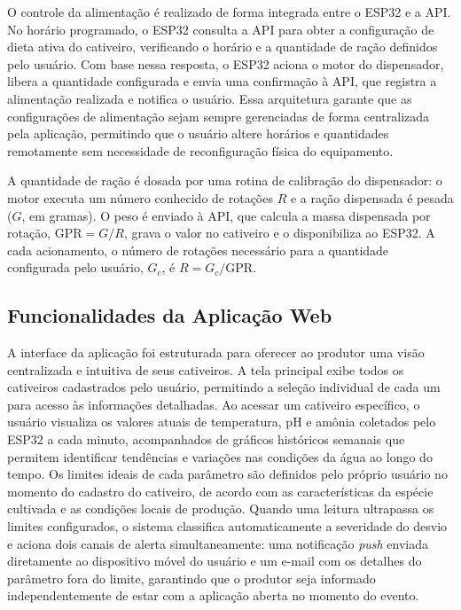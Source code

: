 \documentclass[11pt,a4paper]{article}
\begin{document}
O controle da alimentação é realizado de forma integrada entre o ESP32 e a API. No horário programado, o ESP32 consulta a API para obter a configuração de dieta ativa do cativeiro, verificando o horário e a quantidade de ração definidos pelo usuário. Com base nessa resposta, o ESP32 aciona o motor do dispensador, libera a quantidade configurada e envia uma confirmação à API, que registra a alimentação realizada e notifica o usuário. Essa arquitetura garante que as configurações de alimentação sejam sempre gerenciadas de forma centralizada pela aplicação, permitindo que o usuário altere horários e quantidades remotamente sem necessidade de reconfiguração física do equipamento.

A quantidade de ração é dosada por uma rotina de calibração do dispensador: o motor executa um número conhecido de rotações $R$ e a ração dispensada é pesada ($G$, em gramas). O peso é enviado à API, que calcula a massa dispensada por rotação, $\mathrm{GPR} = G/R$, grava o valor no cativeiro e o disponibiliza ao ESP32. A cada acionamento, o número de rotações necessário para a quantidade configurada pelo usuário, $G_c$, é $R = G_c/\mathrm{GPR}$.
 
\subsection{Funcionalidades da Aplicação Web}
 
A interface da aplicação foi estruturada para oferecer ao produtor uma visão centralizada e intuitiva de seus cativeiros. A tela principal exibe todos os cativeiros cadastrados pelo usuário, permitindo a seleção individual de cada um para acesso às informações detalhadas. Ao acessar um cativeiro específico, o usuário visualiza os valores atuais de temperatura, pH e amônia coletados pelo ESP32 a cada minuto, acompanhados de gráficos históricos semanais que permitem identificar tendências e variações nas condições da água ao longo do tempo. Os limites ideais de cada parâmetro são definidos pelo próprio usuário no momento do cadastro do cativeiro, de acordo com as características da espécie cultivada e as condições locais de produção. Quando uma leitura ultrapassa os limites configurados, o sistema classifica automaticamente a severidade do desvio e aciona dois canais de alerta simultaneamente: uma notificação \textit{push} enviada diretamente ao dispositivo móvel do usuário e um e-mail com os detalhes do parâmetro fora do limite, garantindo que o produtor seja informado independentemente de estar com a aplicação aberta no momento do evento.
 
\end{document}
